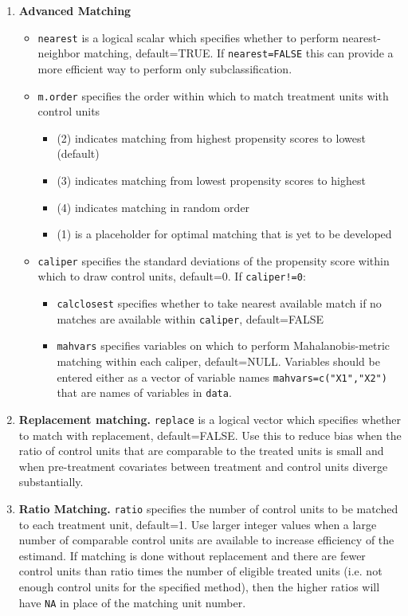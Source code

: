 \documentclass[oneside,letterpaper,titlepage]{article}
\begin{document}
\begin{enumerate}
\item \textbf{Advanced Matching}
  \begin{itemize}
  \item \texttt{nearest} is a logical scalar which specifies whether
    to perform nearest-neighbor matching, default=TRUE.  If
    \texttt{nearest=FALSE} this can provide a more efficient way to
    perform only subclassification. 
  \item \texttt{m.order}  specifies the order within which to match
    treatment units with control units
    \begin{itemize}
    \item (2) indicates matching from highest propensity scores to
      lowest (default)
    \item (3) indicates matching from lowest propensity scores to
      highest
    \item (4) indicates matching in random order
    \item (1) is a placeholder for optimal matching that is yet to be
      developed 
    \end{itemize}
  \item \texttt{caliper} specifies the standard deviations of 
    the propensity score within which to draw control units,
    default=0.  If \texttt{caliper!=0}: 
    \begin{itemize} 
    \item \texttt{calclosest} specifies whether to take nearest
      available match if no matches are available within
      \texttt{caliper}, default=FALSE 
    \item \texttt{mahvars} specifies
      variables on which to perform Mahalanobis-metric matching
      within each caliper, default=NULL.  Variables should be entered
      either as a vector of variable names
      \texttt{mahvars=c("X1","X2")} that are names of variables in
      \texttt{data}. 
    \end{itemize}
  \end{itemize}

\item \textbf{Replacement matching.} \texttt{replace} is a logical vector which specifies whether
  to match with replacement, default=FALSE.  Use this to reduce bias
  when the ratio of control units that are comparable to the treated units
  is small and when pre-treatment covariates between treatment and
  control units diverge substantially.  

\item \textbf{Ratio Matching.}  \texttt{ratio} specifies the number of
  control units to be matched to each treatment unit, default=1.  Use
  larger integer values when a large number of comparable control units are available to
  increase efficiency of the estimand. If matching is done without replacement and there are 
  fewer control units than ratio times the number of eligible treated units (i.e. not enough control
  units for the specified method), then the higher
  ratios will have \texttt{NA} in place of the matching unit number.  


\end{enumerate}
\end{document}
